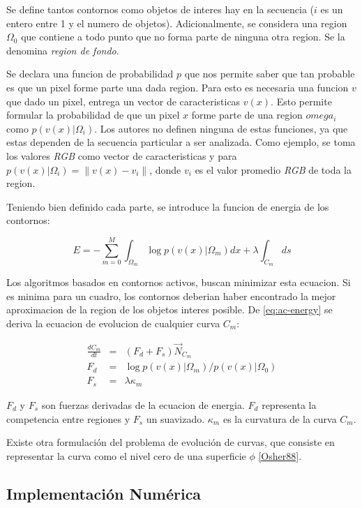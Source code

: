 \documentclass[a4paper,10pt]{article}
\begin{document}
Se define tantos contornos como objetos de interes hay en la secuencia ($i$ es un entero entre 1 y el numero de objetos).
Adicionalmente, se considera una region $\Omega_0$ que contiene a todo punto que no forma parte de ninguna otra region. 
Se la denomina \textit{region de fondo}.

Se declara una funcion de probabilidad $p$ que nos permite saber que tan probable es que un pixel forme parte una dada region.
Para esto es necesaria una funcion $v$ que dado un pixel, entrega un vector de caracteristicas $v(x)$.
Esto permite formular la probabilidad de que un pixel $x$ forme parte de una region $omega_i$ como $p(v(x) \vert \Omega_i)$.
Los autores no definen ninguna de estas funciones, ya que estas dependen de la secuencia particular a ser analizada.
Como ejemplo, se toma los valores \textit{RGB} como vector de caracteristicas y para 
$p(v(x) \vert \Omega_i) = \| v(x) - v_i \| $, donde $v_i$ es el valor promedio \textit{RGB} de toda la region.

Teniendo bien definido cada parte, se introduce la funcion de energia de los contornos:

\begin{equation}
    \label{eq:ac-energy}
    E = - \sum_{m=0}^{M}{\int_{\Omega_m}{\log{p(v(x) \vert \Omega_m)} dx} + \lambda \int_{C_m}{ds}}
\end{equation}

Los algoritmos basados en contornos activos, buscan minimizar esta ecuacion. Si es minima para un cuadro, los contornos
deberian haber encontrado la mejor aproximacion de la region de los objetos interes posible. De \ref{eq:ac-energy} se
deriva la ecuacion de evolucion de cualquier curva $C_m$:

\begin{eqnarray*}
    \frac{dC_m}{dt} &=& (F_d + F_s) \overrightarrow{N}_{C_m} \\
    F_d &=& \log{p(v(x) \vert \Omega_m) / p(v(x) \vert \Omega_0)} \\
    F_s &=& \lambda \kappa_m
\end{eqnarray*}

$F_d$ y $F_s$ son fuerzas derivadas de la ecuacion de energia. $F_d$ representa la competencia entre regiones y $F_s$ un
suavizado. $\kappa_m$ es la curvatura de la curva $C_m$.

Existe otra formulación del problema de evolución de curvas, que consiste en
representar la curva como el nivel cero de una superficie $\phi$ \ref{Osher88}.

\subsection{Implementación Numérica}
\end{document}
